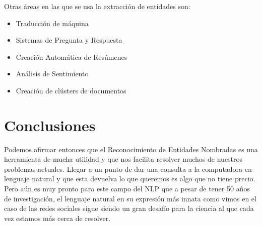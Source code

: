 \documentclass[runningheads]{llncs}
\begin{document}
Otras áreas en las que se usa la extracción de entidades son: \cite{ner_thesis}

\begin{itemize}

\item Traducción de máquina
\item Sistemas de Pregunta y Respuesta
\item Creación Automática de Resúmenes
\item Análisis de Sentimiento
\item Creación de clústers de documentos

\end{itemize}

\section{Conclusiones}

Podemos afirmar entonces que el Reconocimiento de Entidades Nombradas es una herramienta de mucha utilidad y que nos facilita resolver muchos de nuestros problemas actuales. Llegar a un punto de dar una consulta a la computadora en lenguaje natural y que esta devuelva lo que queremos es algo que no tiene precio. Pero aún es muy pronto para este campo del NLP que a pesar de tener 50 años de investigación, el lenguaje natural en su expresión más innata como vimos en el caso de las redes sociales sigue siendo un gran desafío para la ciencia al que cada vez estamos más cerca de resolver.
\end{document}
